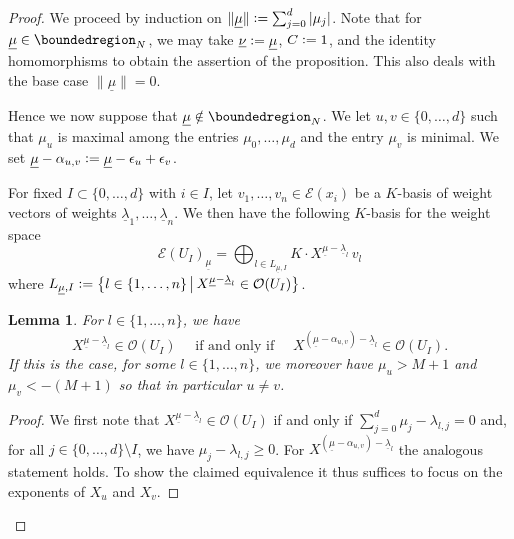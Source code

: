 \documentclass[a4paper, reqno, 10pt]{amsart}
\newtheorem{lemma}[theorem]{Lemma}
\theoremstyle{definition}
\numberwithin{equation}{section}
\newcommand{\abs}[1]{{\lvert{#1}\rvert}}
\newcommand{\defeq}{\vcentcolon=}
\newcommand{\ul}[1]{{\underline{#1}}}
\newcommand{\CE}{{\mathcal {E}}}
\newcommand{\CO}{{\mathcal {O}}}
\begin{document}
\begin{proof}
	We proceed by induction on $\lVert \ul{\mu} \rVert \defeq \sum_{j=0}^d \abs{\mu_j}$.
	Note that for $\ul{\mu} \in \boundedregion_N$, we may take $\ul{\nu}\defeq \ul{\mu}$, $C\defeq 1$, and the identity homomorphisms to obtain the assertion of the proposition.
	This also deals with the base case $\lVert \ul{\mu}\rVert = 0$.
	
	
	Hence we now suppose that $\ul{\mu} \notin \boundedregion_N$.
	We let $u,v \in \{0,\ldots,d\}$ such that $\mu_u$ is maximal among the entries $\mu_0,\ldots,\mu_d$ and the entry $\mu_v$ is minimal.
	We set $\ul{\mu} - \alpha_{u,v} \defeq  \ul{\mu} - \epsilon_u + \epsilon_v $.
	
	
	For fixed $I\subset \{0,\ldots,d\}$ with $i\in I$, let $v_1,\ldots,v_n \in \CE(x_i)$ be a $K$-basis of weight vectors of weights $\ul{\lambda}_1,\ldots,\ul{\lambda}_n$.
	We then have the following $K$-basis for the weight space
	\begin{equation*}
		\CE(U_I)_\ul{\mu} = \bigoplus_{l\in L_{\ul{\mu},I}} K \cdot X^{\ul{\mu} - \ul{\lambda}_l} \, v_l
	\end{equation*}
	where $L_{\ul{\mu},I} \defeq \big\{ l\in \{1,\ldots,n\} \,\big\vert\, X^{\ul{\mu}-\ul{\lambda}_l} \in \CO(U_I) \big\}$.
	
	
	\begin{lemma}\label{Lemma 2 - Comparison of occuring weights}
		For $l\in \{1,\ldots,n\}$, we have 
		\begin{equation*}
			X^{\ul{\mu}-\ul{\lambda}_l} \in \CO(U_I) \quad\text{ if and only if }\quad X^{(\ul{\mu}-\alpha_{u,v})-\ul{\lambda}_l} \in \CO(U_I) .
		\end{equation*}
		If this is the case, for some $l \in \{1,\ldots,n\}$, we moreover have $\mu_u > M+1$ and $\mu_v < - (M+1)$ so that in particular $u \neq v$.
	\end{lemma}
	\begin{proof}
		We first note that $X^{\ul{\mu}-\ul{\lambda}_l} \in \CO(U_I)$ if and only if $\sum_{j=0}^d \mu_j -\lambda_{l,j} = 0$ and, for all $j \in \{0,\ldots,d\}\setminus I$, we have $\mu_j - \lambda_{l,j} \geq 0$.
		For $X^{(\ul{\mu}-\alpha_{u,v})-\ul{\lambda}_l}$ the analogous statement holds.
		To show the claimed equivalence it thus suffices to focus on the exponents of $X_u$ and $X_v$.
		

\end{proof}
\end{proof}
\end{document}
